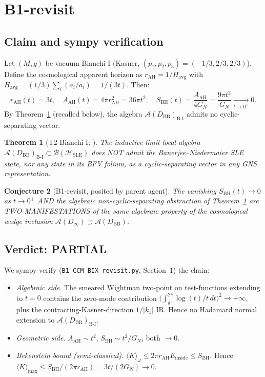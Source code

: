 \documentclass[11pt,a4paper]{article}
\newtheorem{theorem}{Theorem}
\newtheorem{conjecture}[theorem]{Conjecture}
\theoremstyle{definition}
\newcommand{\AA}{\mathcal{A}}
\newcommand{\BI}{\mathrm{B\text{-}I}}
\newcommand{\BB}{\mathrm{BB}}
\begin{document}
\section{B1-revisit}

\subsection{Claim and sympy verification}

Let $(M, g)$ be vacuum Bianchi I (Kasner, $(p_1, p_2, p_3) = (-1/3,
2/3, 2/3)$). Define the cosmological apparent horizon as
$r_{\mathrm{AH}} = 1/H_{\mathrm{avg}}$ with
$H_{\mathrm{avg}} = (1/3) \sum_i (\dot a_i / a_i) = 1/(3t)$. Then:
\begin{equation}
  r_{\mathrm{AH}}(t) = 3t,
  \quad
  A_{\mathrm{AH}}(t) = 4\pi r_{\mathrm{AH}}^2 = 36\pi t^2,
  \quad
  S_{\mathrm{BH}}(t) = \frac{A_{\mathrm{AH}}}{4 G_N} = \frac{9\pi t^2}{G_N}
  \xrightarrow[t\to 0^+]{} 0.
\end{equation}
By Theorem~\ref{thm:T2-BI} (recalled below), the algebra
$\AA(D_\BB)_\BI$ admits no cyclic-separating vector.

\begin{theorem}[T2-Bianchi I; \cite{T2BIextension2026}]\label{thm:T2-BI}
The inductive-limit local algebra
$\AA(D_\BB)_\BI \subset \mathcal{B}(\mathcal{H}_{\mathrm{SLE}})$ does
NOT admit the Banerjee--Niedermaier SLE state, nor any state in its
BFV folium, as a cyclic-separating vector in any GNS representation.
\end{theorem}

\begin{conjecture}[B1-revisit, posited by parent agent]\label{conj:B1-revisit}
The vanishing $S_{\mathrm{BH}}(t) \to 0$ as $t\to 0^+$ AND the algebraic
non-cyclic-separating obstruction of Theorem~\ref{thm:T2-BI} are TWO
MANIFESTATIONS of the same algebraic property of the cosmological
wedge inclusion $\AA(D_\infty) \supset \AA(D_\BB)$.
\end{conjecture}

\subsection{Verdict: PARTIAL}

We sympy-verify (\texttt{B1\_CCM\_BIX\_revisit.py}, Section~1) the
chain:
\begin{itemize}
  \item \emph{Algebraic side.} The smeared Wightman two-point on
  test-functions extending to $t = 0$ contains the zero-mode
  contribution $\bigl(\int_\delta^{2\delta} \log(t)/t\,dt\bigr)^2 \to
  +\infty$, plus the contracting-Kasner-direction $1/|k_1|$ IR.
  Hence no Hadamard normal extension to $\AA(D_\BB)_\BI$.
  \item \emph{Geometric side.} $A_{\mathrm{AH}} \sim t^2$,
  $S_{\mathrm{BH}} \sim t^2/G_N$, both $\to 0$.
  \item \emph{Bekenstein bound (semi-classical).} $\langle K
  \rangle_\omega \le 2\pi r_{\mathrm{AH}} E_{\mathrm{inside}} \le
  S_{\mathrm{BH}}$. Hence
  $\langle K \rangle_{\max} \le S_{\mathrm{BH}}/(2\pi r_{\mathrm{AH}}) =
  3t/(2 G_N) \to 0$.
\end{itemize}
\end{document}

